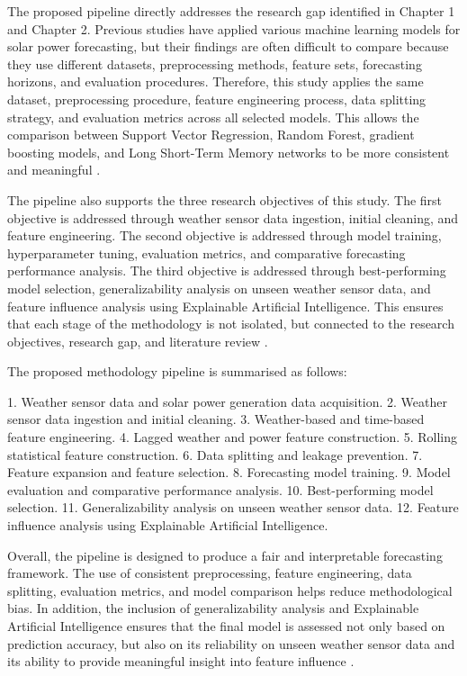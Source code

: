 The proposed pipeline directly addresses the research gap identified in Chapter 1 and Chapter 2. Previous studies have applied various machine learning models for solar power forecasting, but their findings are often difficult to compare because they use different datasets, preprocessing methods, feature sets, forecasting horizons, and evaluation procedures. Therefore, this study applies the same dataset, preprocessing procedure, feature engineering process, data splitting strategy, and evaluation metrics across all selected models. This allows the comparison between Support Vector Regression, Random Forest, gradient boosting models, and Long Short-Term Memory networks to be more consistent and meaningful \parencite{ArellanosTafur2025, TsaiLo2025, CarvalhoJunior2025}.

The pipeline also supports the three research objectives of this study. The first objective is addressed through weather sensor data ingestion, initial cleaning, and feature engineering. The second objective is addressed through model training, hyperparameter tuning, evaluation metrics, and comparative forecasting performance analysis. The third objective is addressed through best-performing model selection, generalizability analysis on unseen weather sensor data, and feature influence analysis using Explainable Artificial Intelligence. This ensures that each stage of the methodology is not isolated, but connected to the research objectives, research gap, and literature review \parencite{Eren2025, Duvuru2026, Ma2025}.

The proposed methodology pipeline is summarised as follows:

1. Weather sensor data and solar power generation data acquisition.
2. Weather sensor data ingestion and initial cleaning.
3. Weather-based and time-based feature engineering.
4. Lagged weather and power feature construction.
5. Rolling statistical feature construction.
6. Data splitting and leakage prevention.
7. Feature expansion and feature selection.
8. Forecasting model training.
9. Model evaluation and comparative performance analysis.
10. Best-performing model selection.
11. Generalizability analysis on unseen weather sensor data.
12. Feature influence analysis using Explainable Artificial Intelligence.

Overall, the pipeline is designed to produce a fair and interpretable forecasting framework. The use of consistent preprocessing, feature engineering, data splitting, evaluation metrics, and model comparison helps reduce methodological bias. In addition, the inclusion of generalizability analysis and Explainable Artificial Intelligence ensures that the final model is assessed not only based on prediction accuracy, but also on its reliability on unseen weather sensor data and its ability to provide meaningful insight into feature influence \parencite{JnanaVarshitha2025, Eren2025, TsaiLo2025}.

